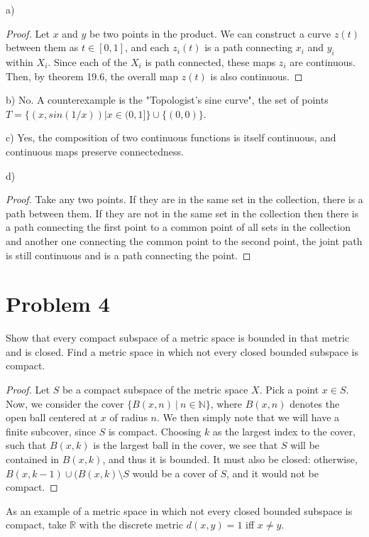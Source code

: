 \documentclass[11pt]{article}
\begin{document}
a) 
\begin{proof}
Let \(x\) and \(y\) be two points in the product. We can construct a curve \(z(t)\)
between them as \(t \in [0,1]\), and each \(z_i(t)\) is a path connecting \(x_i\) and
\(y_i\) within \(X_i\). Since each of the \(X_i\) is path connected, these maps \(z_i\)
are continuous. Then, by theorem 19.6, the overall map \(z(t)\) is also
continuous. 
\end{proof}


b) No. A counterexample is the "Topologist's sine curve", the set of points \(T =
\{(x, sin(1/x)) | x \in (0,1]\}\cup\{(0,0)\}\).


c) Yes, the composition of two continuous functions is itself continuous, and
continuous maps preserve connectedness. 


d) 
\begin{proof}
Take any two points. If they are in the same set in the collection, there is a
path between them. If they are not in the same set in the collection then there
is a path connecting the first point to a common point of all sets in the
collection and another one connecting the common point to the second point, the
joint path is still continuous and is a path connecting the point.
\end{proof}
\section{Problem 4}
\label{sec:org43f65fb}

Show that every compact subspace of a metric space is bounded in that metric and
is closed. Find a metric space in which not every closed bounded subspace is
compact. 


\begin{proof}
Let \(S\) be a compact subspace of the metric space \(X\). Pick a point \(x\in S\).
Now, we consider the cover \(\{B(x,n)\ |\ n\in\mathbb{N}\}\), where \(B(x,n)\)
denotes the open ball centered at \(x\) of radius \(n\). We then simply note that we
will have a finite subcover, since \(S\) is compact. Choosing \(k\) as the largest
index to the cover, such that \(B(x,k)\) is the largest ball in the cover, we see
that \(S\) will be contained in \(B(x,k)\), and thus it is bounded. It must also be
closed: otherwise, \(B(x,k-1)\cup(B(x,k)\setminus S\) would be a cover of \(S\), and
it would not be compact. 
\end{proof}

As an example of a metric space in which not every closed bounded subspace is
compact, take \(\mathbb{R}\) with the discrete metric \(d(x,y) = 1\) iff \(x\not =
y\).
\end{document}
